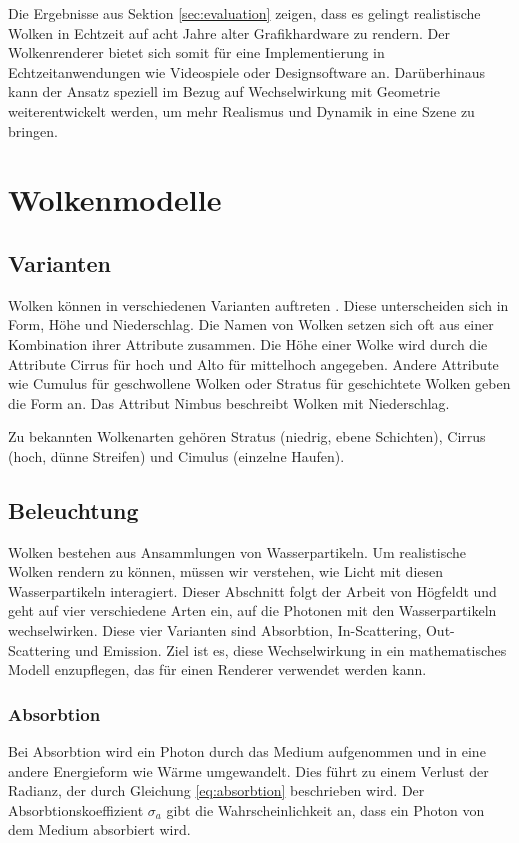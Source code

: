 Die Ergebnisse aus Sektion \ref{sec:evaluation} zeigen, dass es gelingt realistische Wolken in Echtzeit auf acht Jahre alter Grafikhardware zu rendern. Der Wolkenrenderer bietet sich somit für eine Implementierung in Echtzeitanwendungen wie Videospiele oder Designsoftware an. Darüberhinaus kann der Ansatz speziell im Bezug auf Wechselwirkung mit Geometrie weiterentwickelt werden, um mehr Realismus und Dynamik in eine Szene zu bringen.

\section{Wolkenmodelle}
\label{sec:model}

\subsection{Varianten}
Wolken können in verschiedenen Varianten auftreten \cite{Högfeldt16}. Diese unterscheiden sich in Form, Höhe und Niederschlag. Die Namen von Wolken setzen sich oft aus einer Kombination ihrer Attribute zusammen. Die Höhe einer Wolke wird durch die Attribute Cirrus für hoch und Alto für mittelhoch angegeben. Andere Attribute wie Cumulus für geschwollene Wolken oder Stratus für geschichtete Wolken geben die Form an. Das Attribut Nimbus beschreibt Wolken mit Niederschlag.

Zu bekannten Wolkenarten gehören Stratus (niedrig, ebene Schichten), Cirrus (hoch, dünne Streifen) und Cimulus (einzelne Haufen).

\subsection{Beleuchtung}
Wolken bestehen aus Ansammlungen von Wasserpartikeln. Um realistische Wolken rendern zu können, müssen wir verstehen, wie Licht mit diesen Wasserpartikeln interagiert. Dieser Abschnitt folgt der Arbeit von Högfeldt \cite{Högfeldt16} und geht auf vier verschiedene Arten ein, auf die Photonen mit den Wasserpartikeln wechselwirken. Diese vier Varianten sind Absorbtion, In-Scattering, Out-Scattering und Emission. Ziel ist es, diese Wechselwirkung in ein mathematisches Modell enzupflegen, das für einen Renderer verwendet werden kann.

\subsubsection{Absorbtion}
Bei Absorbtion wird ein Photon durch das Medium aufgenommen und in eine andere Energieform wie Wärme umgewandelt. Dies führt zu einem Verlust der Radianz, der durch Gleichung \ref{eq:absorbtion} beschrieben wird. Der Absorbtionskoeffizient $ \sigma_a $ gibt die Wahrscheinlichkeit an, dass ein Photon von dem Medium absorbiert wird.

